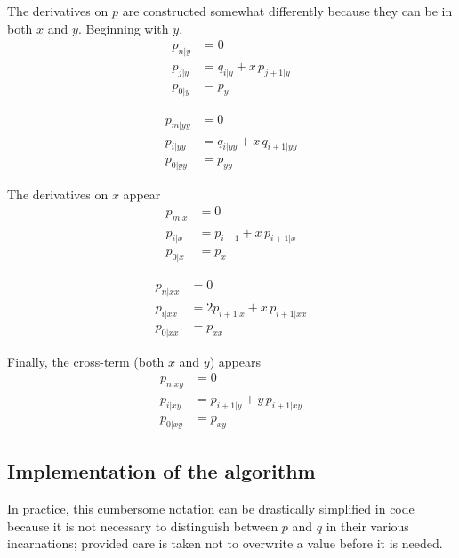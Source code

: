 \documentclass[letterpaper,11pt]{article}
\begin{document}
The derivatives on $p$ are constructed somewhat differently because they can be in both $x$ and $y$.  Beginning with $y$,
\begin{subequations}
\begin{align}
p_{n|y} &= 0\\
p_{j|y} &= q_{i|y} + x\,p_{j+1|y}\\
p_{0|y} &= p_y
\end{align}
\end{subequations}

\begin{subequations}
\begin{align}
p_{m|yy} &= 0\\
p_{i|yy} &= q_{i|yy} + x\,q_{i+1|yy}\\
p_{0|yy} &= p_{yy}
\end{align}
\end{subequations}

The derivatives on $x$ appear
\begin{subequations}
\begin{align}
p_{m|x} &= 0\\
p_{i|x} &= p_{i+1} + x\,p_{i+1|x}\\
p_{0|x} &= p_x
\end{align}
\end{subequations}

\begin{subequations}
\begin{align}
p_{n|xx} &= 0\\
p_{i|xx} &= 2 p_{i+1|x} + x\,p_{i+1|xx}\\
p_{0|xx} &= p_{xx}
\end{align}
\end{subequations}

Finally, the cross-term (both $x$ and $y$) appears
\begin{subequations}
\begin{align}
p_{n|xy} &= 0\\
p_{i|xy} &= p_{i+1|y} + y\,p_{i+1|xy}\\
p_{0|xy} &= p_{xy}
\end{align}
\end{subequations}

\subsection{Implementation of the algorithm}
In practice, this cumbersome notation can be drastically simplified in code because it is not necessary to distinguish between $p$ and $q$ in their various incarnations; provided care is taken not to overwrite a value before it is needed.
\end{document}

